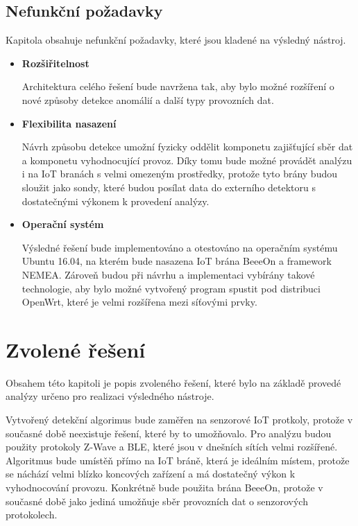   \subsection{Nefunkční požadavky}
  Kapitola obsahuje nefunkční požadavky, které jsou kladené na výsledný nástroj.
  \begin{itemize}
   \item \textbf{Rozšiřitelnost}
   
   Architektura celého řešení bude navržena tak, aby bylo možné rozšíření o nové 
   způsoby detekce anomálií a další typy provozních dat.
   
   \item \textbf{Flexibilita nasazení}
   
   Návrh způsobu detekce umožní fyzicky oddělit komponetu zajišťující sběr dat a komponetu vyhodnocující 
   provoz. Díky tomu bude možné provádět analýzu i na IoT branách s velmi omezeným prostředky, protože 
   tyto brány budou sloužit jako sondy, které budou posílat data do externího detektoru s dostatečnými 
   výkonem k provedení analýzy. 
   
   \item \textbf{Operační systém}
   
   Výsledné řešení bude implementováno a otestováno na operačním systému Ubuntu 16.04, na kterém 
   bude nasazena IoT brána BeeeOn a framework NEMEA. Zároveň
   budou při návrhu a implementaci vybírány takové technologie, aby bylo možné vytvořený program
   spustit pod distribuci OpenWrt, které je velmi rozšířena mezi síťovými prvky.   
  \end{itemize}

 \newpage 
 \section{Zvolené řešení}
 Obsahem této kapitoli je popis zvoleného řešení, které bylo na základě provedé analýzy
 určeno pro realizaci výsledného nástroje.
 
 Vytvořený detekční algorimus bude zaměřen na senzorové IoT protkoly, protože v současné době 
 neexistuje řešení, které by to umožňovalo. Pro analýzu budou použity protokoly Z-Wave a BLE, 
 které jsou v dnešních sítích velmi rozšířené. Algoritmus bude umístěň přímo na IoT bráně, která 
 je ideálním místem, protože
 se náchází velmi blízko koncových zařízení a má dostatečný výkon k vyhodnocování provozu. 
 Konkrétně bude použita brána BeeeOn, protože v současné době 
 jako jediná umožňuje sběr provozních dat o senzorových protokolech. 
 
